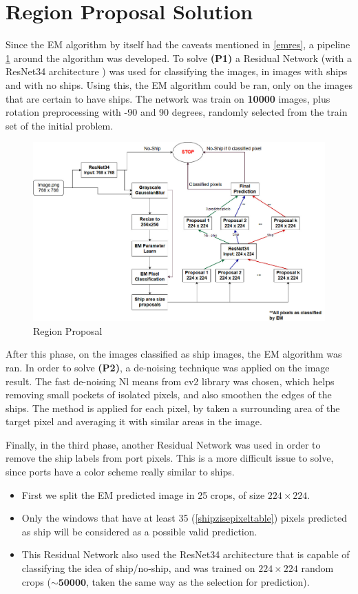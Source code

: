 \section{Region Proposal Solution}
\label{regPropSol}
Since the EM algorithm by itself had the caveats mentioned in \ref{emres}, a pipeline \ref{arch1} around the algorithm was developed.
To solve \textbf{(P1)} a Residual Network (with a ResNet34 architecture \cite{ResNetPaper}) was used for classifying the images, in images with ships and with no ships. Using this, the EM algorithm could be ran, only on the images that are certain to have ships. The network was train on \textbf{10000} images, plus rotation preprocessing with -90 and 90 degrees, randomly selected from the train set of the initial problem.

\begin{figure}[h]
	\centering
	\includegraphics[angle=90,height=0.8\textheight]{Pictures/010Architecture1.jpg}
	\caption{Region Proposal}
	\label{arch1}
\end{figure}

After this phase, on the images classified as ship images, the EM algorithm was ran. In order to solve \textbf{(P2)}, a de-noising technique was applied on the image result. The fast de-noising Nl means from cv2 library was chosen, which helps removing small pockets of isolated pixels, and also smoothen the edges of the ships. The method is applied for each pixel, by taken a surrounding area of the target pixel and averaging it with similar areas in the image.

Finally, in the third phase, another Residual Network was used in order to remove the ship labels from port pixels. This is a more difficult issue to solve, since ports have a color scheme really similar to ships.
\begin{itemize}
	\item First we split the EM predicted image in 25 crops, of size $224 \times 224$.
	\item Only the windows that have at least 35 (\ref{shipzisepixeltable}) pixels predicted as ship will be considered as a possible valid prediction.
	\item This Residual Network also used the ResNet34 architecture \cite{ResNetPaper} that is capable of classifying the idea of ship/no-ship, and was trained on $224\times224$ random crops ($\sim \mathbf{50000}$, taken the same way as the selection for prediction).
\end{itemize}

